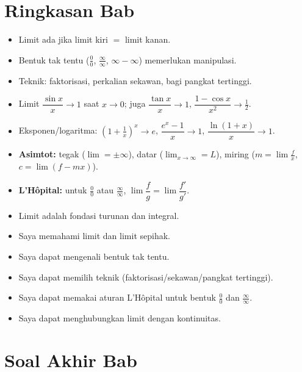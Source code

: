 \documentclass[11pt,a4paper]{report}
\theoremstyle{gaya}
\newcommand{\cek}{\ding{113}\ } %
\begin{document}
\section*{Ringkasan Bab}
\begin{itemize}[leftmargin=*,topsep=2pt]
  \item Limit ada jika limit kiri $=$ limit kanan.
  \item Bentuk tak tentu ($\tfrac00$, $\tfrac\infty\infty$, $\infty-\infty$) memerlukan manipulasi.
  \item Teknik: faktorisasi, perkalian sekawan, bagi pangkat tertinggi.
  \item Limit $\dfrac{\sin x}{x}\to1$ saat $x\to0$; juga $\dfrac{\tan x}{x}\to1$, $\dfrac{1-\cos x}{x^2}\to\tfrac12$.
  \item Eksponen/logaritma: $\left(1+\tfrac1x\right)^x\to e$, $\dfrac{e^x-1}{x}\to1$, $\dfrac{\ln(1+x)}{x}\to1$.
  \item \textbf{Asimtot:} tegak ($\lim=\pm\infty$), datar ($\lim_{x\to\infty}=L$), miring ($m=\lim\tfrac fx$, $c=\lim(f-mx)$).
  \item \textbf{L'Hôpital:} untuk $\tfrac00$ atau $\tfrac\infty\infty$, $\lim\dfrac fg=\lim\dfrac{f'}{g'}$.
  \item Limit adalah fondasi turunan dan integral.
\end{itemize}

\begin{refleksi}
\begin{itemize}[leftmargin=*,topsep=2pt]
  \item[\cek] Saya memahami limit dan limit sepihak.
  \item[\cek] Saya dapat mengenali bentuk tak tentu.
  \item[\cek] Saya dapat memilih teknik (faktorisasi/sekawan/pangkat tertinggi).
  \item[\cek] Saya dapat memakai aturan L'Hôpital untuk bentuk $\tfrac00$ dan $\tfrac\infty\infty$.
  \item[\cek] Saya dapat menghubungkan limit dengan kontinuitas.
\end{itemize}
\end{refleksi}

\section*{Soal Akhir Bab \thechapter}
\end{document}
